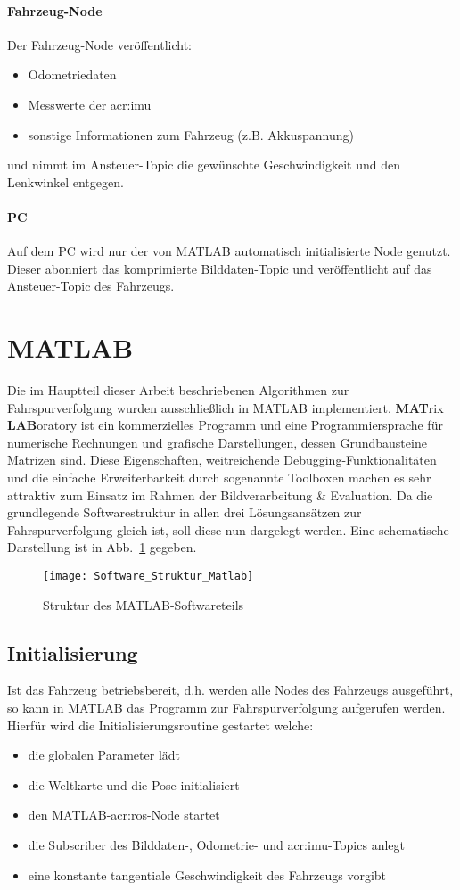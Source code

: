 \paragraph{Fahrzeug-Node}
Der Fahrzeug-Node veröffentlicht:
\begin{itemize}
\item Odometriedaten 
\item Messwerte der \gls{acr:imu}
\item sonstige Informationen zum Fahrzeug (z.B. Akkuspannung)
\end{itemize}
und nimmt im Ansteuer-Topic die gewünschte Geschwindigkeit und den Lenkwinkel entgegen.
\paragraph{PC}
Auf dem PC wird nur der von MATLAB automatisch initialisierte Node genutzt. Dieser abonniert das komprimierte Bilddaten-Topic und veröffentlicht auf das Ansteuer-Topic des Fahrzeugs.

\section{MATLAB \dcsecondauthorshort}
Die im Hauptteil dieser Arbeit beschriebenen Algorithmen zur Fahrspurverfolgung wurden ausschließlich in MATLAB implementiert. \textbf{MAT}rix \textbf{LAB}oratory ist ein kommerzielles Programm und eine Programmiersprache für numerische Rechnungen und grafische Darstellungen, dessen Grundbausteine Matrizen sind. Diese Eigenschaften, weitreichende Debugging-Funktionalitäten und die einfache Erweiterbarkeit durch sogenannte Toolboxen machen es sehr attraktiv zum Einsatz im Rahmen der Bildverarbeitung \& Evaluation. Da die grundlegende Softwarestruktur in allen drei Lösungsansätzen zur Fahrspurverfolgung gleich ist, soll diese nun dargelegt werden. Eine schematische Darstellung ist in Abb.~\ref{fig:software_struktur:matlab} gegeben.

\begin{figure}[htbp]
	\centering
	\texttt{[image: Software\_Struktur\_Matlab]}
	\caption{Struktur des MATLAB-Softwareteils}
	\label{fig:software_struktur:matlab}
\end{figure}

\subsection{Initialisierung}
Ist das Fahrzeug betriebsbereit, d.h. werden alle Nodes des Fahrzeugs ausgeführt, so kann in MATLAB das Programm zur Fahrspurverfolgung aufgerufen werden. Hierfür wird die Initialisierungsroutine gestartet welche:
\begin{itemize}
\item die globalen Parameter lädt
\item die Weltkarte und die Pose initialisiert
\item den MATLAB-\gls{acr:ros}-Node startet
\item die Subscriber des Bilddaten-, Odometrie- und \gls{acr:imu}-Topics anlegt
\item eine konstante tangentiale Geschwindigkeit des Fahrzeugs vorgibt 
\end{itemize}

